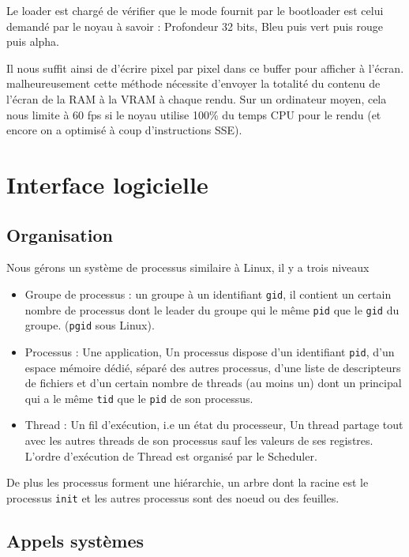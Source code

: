 \documentclass[12pt]{report}
\begin{document}
Le loader est chargé de vérifier que le mode fournit par le bootloader est celui
demandé par le noyau à savoir : Profondeur 32 bits, Bleu puis vert puis rouge
puis alpha.

Il nous suffit ainsi de d'écrire pixel par pixel dans ce buffer pour afficher à
l'écran. malheureusement cette méthode nécessite d'envoyer la totalité du
contenu de l'écran de la RAM à la VRAM à chaque rendu. Sur un ordinateur moyen,
cela nous limite à 60 fps si le noyau utilise 100\% du temps CPU pour le rendu
(et encore on a optimisé à coup d'instructions SSE).

\chapter{Interface logicielle}

\section{Organisation}

Nous gérons un système de processus similaire à Linux, il y a trois niveaux
\begin{itemize}
\item Groupe de processus : un groupe à un identifiant \verb$gid$, il contient
  un certain nombre de processus dont le leader du groupe qui le même \verb$pid$
  que le \verb$gid$ du groupe. (\verb$pgid$ sous Linux).
\item Processus : Une application, Un processus dispose d'un identifiant
  \verb$pid$, d'un espace mémoire dédié, séparé des autres processus, d'une
  liste de descripteurs de fichiers et d'un certain nombre de threads (au moins
  un) dont un principal qui a le même \verb$tid$ que le \verb$pid$ de son processus. 
\item Thread : Un \og fil \fg{} d'exécution, i.e un état du processeur, Un
  thread partage tout avec les autres threads de son processus sauf les valeurs
  de ses registres. L'ordre d'exécution de Thread est organisé par le Scheduler. 
\end{itemize}

De plus les processus forment une hiérarchie, un arbre dont la racine est le
processus \verb$init$ et les autres processus sont des noeud ou des feuilles.

\section{Appels systèmes}
\end{document}
